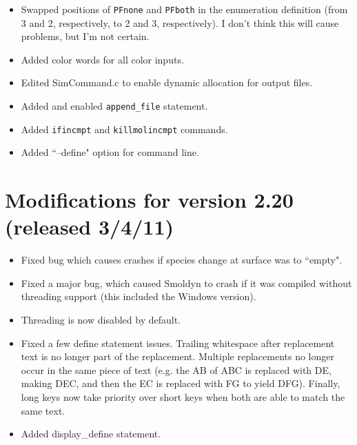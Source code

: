 \documentclass {scrbook}
\newcommand {\ttt} {\texttt}
\begin{document}
\begin{itemize}
\item Swapped positions of \ttt{PFnone} and \ttt{PFboth} in the enumeration definition (from 3 and 2, respectively, to 2 and 3, respectively). I don't think this will cause problems, but I'm not certain.
\item Added color words for all color inputs.
\item Edited SimCommand.c to enable dynamic allocation for output files.
\item Added and enabled \ttt{append\_file} statement.
\item Added \ttt{ifincmpt} and \ttt{killmolincmpt} commands.
\item Added ``--define" option for command line.
\end{itemize}

\section{Modifications for version 2.20 (released 3/4/11)}
\begin{itemize}
\item Fixed bug which causes crashes if species change at surface was to ``empty".
\item Fixed a major bug, which caused Smoldyn to crash if it was compiled without threading support (this included the Windows version).
\item Threading is now disabled by default.
\item Fixed a few define statement issues. Trailing whitespace after replacement text is no longer part of the replacement. Multiple replacements no longer occur in the same piece of text (e.g. the AB of ABC is replaced with DE, making DEC, and then the EC is replaced with FG to yield DFG). Finally, long keys now take priority over short keys when both are able to match the same text.
\item Added display\_define statement.
\end{itemize}
\end{document}
